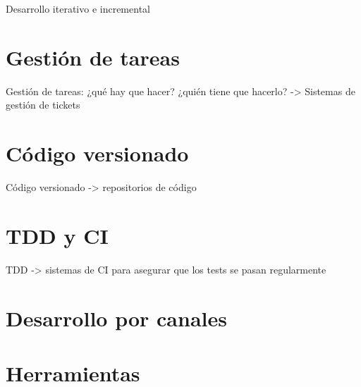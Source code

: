 Desarrollo iterativo e incremental

\section{Gestión de tareas}
\label{sec:gestion-tareas}

\par Gestión de tareas: ¿qué hay que hacer? ¿quién tiene que hacerlo? -> Sistemas de gestión de tickets

\section{Código versionado}
\label{sec:codigo-versionado}

\par Código versionado -> repositorios de código


\section{TDD y CI}
\label{sec:tdd-ci}

\par TDD -> sistemas de CI para asegurar que los tests se pasan regularmente


\section{Desarrollo por canales}
\label{sec:desarrollo-canales}


\section{Herramientas}
\label{sec:herramientas}

